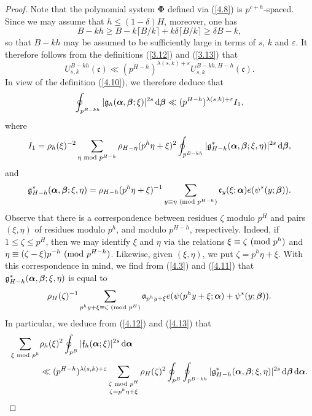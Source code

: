 \documentclass[12pt,reqno]{amsart}
\theoremstyle{definition}
\theoremstyle{remark}
\numberwithin{equation}{section}
\newcommand{\mmod}[1]{\,\,(\text{\rm mod}\,\,#1)}
\newcommand{\nmod}[1]{\,\,\text{\rm mod}\,\,#1}
\def\gra{{\mathfrak a}}\def\grA{{\mathfrak A}}\def\bfgra{{\boldsymbol \gra}}
\def\grc{{\mathfrak c}}\def\grC{{\mathfrak C}}\def\bfgrc{{\boldsymbol \grc}}
\def\grf{{\mathfrak f}}\def\grF{{\mathfrak F}}
\def\grg{{\mathfrak g}}\def\grG{{\mathfrak G}}
\def\del{{\delta}} \def\Del{{\Delta}} \def\Deltil{{\widetilde \Delta}}
\def\zet{{\zeta}} \def\bfzet{{\boldsymbol \zeta}} \def\zetbar{{\overline \zet}}
\def\lam{{\lambda}} \def\Lam{{\Lambda}} \def\Lamtil{{\widetilde \Lambda}}
\def\bfPhi{{\boldsymbol \Phi}} \def\bfvarphi{{\boldsymbol \varphi}}
\def\eps{\varepsilon}
\def\le{\leqslant} \def\ge{\geqslant} \def\pleq{\preccurlyeq} \def\ple{\prec}
\def\d{{\,{\rm d}}}
\begin{document}
\begin{proof}
\par Note that the polynomial system $\bfPhi$ defined via (\ref{4.8}) is 
$p^{c+h}$-spaced. Since we may assume that $h\le (1-\del)H$, moreover, one has
$$B-kh\ge B-k\lceil B/k\rceil +k\del \lceil B/k\rceil \ge \del B-k,$$
so that $B-kh$ may be assumed to be sufficiently large in terms of $s$, $k$ and $\eps$. 
It therefore follows from the definitions (\ref{3.12}) and (\ref{3.13}) that
$$U_{s,k}^{B-kh}(\bfgrc)\ll (p^{H-h})^{\lam(s,k)+\eps}U_{s,k}^{B-kh,H-h}(\bfgrc).$$
In view of the definition (\ref{4.10}), we therefore deduce that
\begin{equation}\label{4.13}
\oint_{p^{B-kh}}|\grg_h(\bfalp,\bfbet;\xi)|^{2s}\d\bfbet \ll 
(p^{H-h})^{\lam(s,k)+\eps}I_1,
\end{equation}
where
$$I_1=\rho_h(\xi)^{-2}\sum_{\eta\nmod{p^{H-h}}}\rho_{H-\eta}(p^h\eta+\xi)^2
\oint_{p^{B-kh}}|\grg^*_{H-h}(\bfalp,\bfbet;\xi,\eta)|^{2s}\d\bfbet ,$$
and
$$\grg^*_{H-h}(\bfalp,\bfbet;\xi,\eta)=\rho_{H-h}(p^h\eta +\xi)^{-1}
\sum_{y\equiv \eta\mmod{p^{H-h}}}\grc_y(\xi;\bfalp)e(\psi^*(y;\bfbet)).$$
Observe that there is a correspondence between residues $\zet$ modulo $p^H$ and 
pairs $(\xi,\eta)$ of residues modulo $p^h$, and modulo $p^{H-h}$, respectively. 
Indeed, if $1\le \zet \le p^H$, then we may identify $\xi$ and $\eta$ via the relations 
$\xi\equiv \zet\mmod{p^h}$ and $\eta\equiv (\zet-\xi)p^{-h}\mmod{p^{H-h}}$. 
Likewise, given $(\xi,\eta)$, we put $\zet=p^h\eta+\xi$. With this correspondence in 
mind, we find from (\ref{4.3}) and (\ref{4.11}) that 
$\grg^*_{H-h}(\bfalp,\bfbet;\xi,\eta)$ is equal to
$$\rho_H(\zet)^{-1}\sum_{p^hy+\xi\equiv \zet\mmod{p^H}}\gra_{p^hy+\xi}
e(\psi(p^hy+\xi;\bfalp)+\psi^*(y;\bfbet)).$$
In particular, we deduce from (\ref{4.12}) and (\ref{4.13}) that
\begin{align}
\sum_{\xi\nmod{p^h}}&\rho_h(\xi)^2\oint_{p^B}|\grf_h(\bfalp;\xi)|^{2s}
\d\bfalp \notag \\
&\ll (p^{H-h})^{\lam(s,k)+\eps}\sum_{\substack{\zet\nmod{p^H}\\ \zet=p^h\eta+\xi}}
\rho_H(\zet)^2\oint_{p^B}\oint_{p^{B-kh}}|\grg^*_{H-h}(\bfalp,\bfbet;\xi,\eta)|^{2s}
\d\bfbet\d\bfalp .\label{4.14}
\end{align}


\end{proof}
\end{document}
